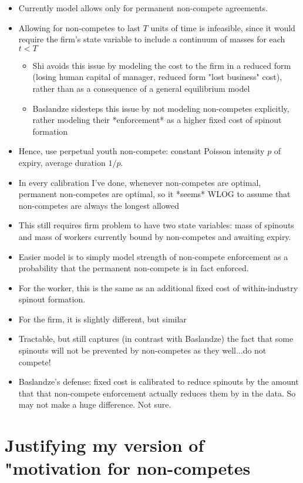 \documentclass[12pt,english]{article}
\theoremstyle{remark}
\begin{document}
\begin{itemize}
	\item Currently model allows only for permanent non-compete agreements.
	\item Allowing for non-competes to last $T$ units of time is infeasible, since it would require the firm's state variable to include a continuum of masses for each $t < T$ 
	\begin{itemize}
		\item Shi avoids this issue by modeling the cost to the firm in a reduced form (losing human capital of manager, reduced form "lost business" cost), rather than as a consequence of a general equilibrium model
		\item Baslandze sidesteps this issue by not modeling non-competes explicitly, rather modeling their *enforcement* as a higher fixed cost of spinout formation
	\end{itemize}
	\item Hence, use perpetual youth non-compete: constant Poisson intensity $p$ of expiry, average duration $1/p$. 
	\item In every calibration I've done, whenever non-competes are optimal, permanent non-competes are optimal, so it *seems* WLOG to assume that non-competes are always the longest allowed
	\item This still requires firm problem to have two state variables: mass of spinouts and mass of workers currently bound by non-competes and awaiting expiry.
	\item Easier model is to simply model strength of non-compete enforcement as a probability that the permanent non-compete is in fact enforced. 
	\item For the worker, this is the same as an additional fixed cost of within-industry spinout formation.
	\item For the firm, it is slightly different, but similar
	\item Tractable, but still captures (in contrast with Baslandze) the fact that some spinouts will not be prevented by non-competes as they well...do not compete!
	\item Baslandze's defense: fixed cost is calibrated to reduce spinouts by the amount that that non-compete enforcement actually reduces them by in the data. So may not make a huge difference. Not sure. 
\end{itemize}

\section{Justifying my version of "motivation for non-competes}
\end{document}
